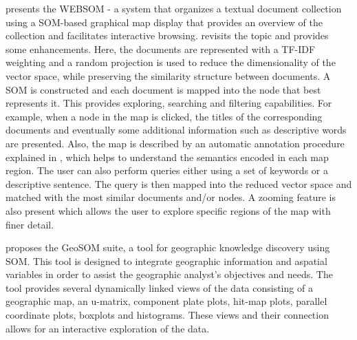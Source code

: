 \documentclass[a4paper]{article}
\begin{document}
\citet{kaski1998} presents the WEBSOM - a system that organizes a textual document collection using a SOM-based graphical map display that provides an overview of the collection and facilitates interactive browsing. \citet{kohonen2013} revisits the topic and provides some enhancements. Here, the documents are represented with a TF-IDF weighting and a random projection is used to reduce the dimensionality of the vector space, while preserving the similarity structure between documents. A SOM is constructed and each document is mapped into the node that best represents it. This provides exploring, searching and filtering capabilities. For example, when a node in the map is clicked, the titles of the corresponding documents and eventually some additional information such as descriptive words are presented. Also, the map is described by an automatic annotation procedure explained in \citet{lagus1999}, which helps to understand the semantics encoded in each map region. The user can also perform queries either using a set of keywords or a descriptive sentence. The query is then mapped into the reduced vector space and matched with the most similar documents and/or nodes. A zooming feature is also present which allows the user to explore specific regions of the map with finer detail.

\citet{henriques2012} proposes the GeoSOM suite, a tool for geographic knowledge discovery using SOM. This tool is designed to integrate geographic information and aspatial variables in order to assist the geographic analyst's objectives and needs. The tool provides several dynamically linked views of the data consisting of a geographic map, an u-matrix, component plate plots, hit-map plots, parallel coordinate plots, boxplots and histograms. These views and their connection allows for an interactive exploration of the data.
\end{document}
